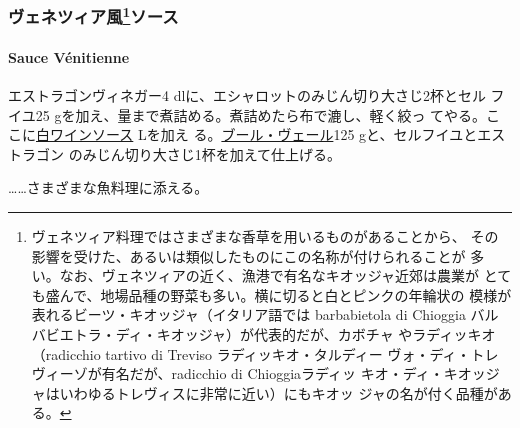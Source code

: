 \begin{recette}
{\subsubsection[ヴェネツィア風ソース]{\texorpdfstring{ヴェネツィア風\footnote{ヴェネツィア料理ではさまざまな香草を用いるものがあることから、
  その影響を受けた、あるいは類似したものにこの名称が付けられることが
  多い。なお、ヴェネツィアの近く、漁港で有名なキオッジャ近郊は農業が
  とても盛んで、地場品種の野菜も多い。横に切ると白とピンクの年輪状の
  模様が表れるビーツ・キオッジャ（イタリア語では barbabietola di
  Chioggia バルバビエトラ・ディ・キオッジャ）が代表的だが、カボチャ
  やラディッキオ（radicchio tartivo di Treviso ラディッキオ・タルディー
  ヴォ・ディ・トレヴィーゾが有名だが、radicchio di Chioggiaラディッ
  キオ・ディ・キオッジャはいわゆるトレヴィスに非常に近い）にもキオッ
  ジャの名が付く品種がある。}ソース}{ヴェネツィア風ソース}}\label{ux30f4ux30a7ux30cdux30c4ux30a3ux30a2ux98a8148ux30bdux30fcux30b9}}

\hypertarget{sauce-vuxe9nitienne}{%
\paragraph{Sauce Vénitienne}\label{sauce-vuxe9nitienne}}


エストラゴンヴィネガー4 dlに、エシャロットのみじん切り大さじ2杯とセル
フイユ25 gを加え、\untiers{}量まで煮詰める。煮詰めたら布で漉し、軽く絞っ
てやる。ここに\protect\hyperlink{sauce-vin-blanc}{白ワインソース}\troisquarts{}
Lを加え る。\protect\hyperlink{beurre-vert}{ブール・ヴェール}125
gと、セルフイユとエストラゴン のみじん切り大さじ1杯を加えて仕上げる。

\ldots{}\ldots{}さまざまな魚料理に添える。
\end{recette}